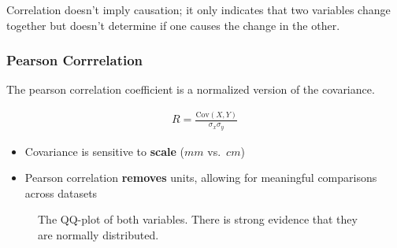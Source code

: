 \documentclass[
  a4paper,
]{scrbook}
\providecommand{\tightlist}{%
  \setlength{\itemsep}{0pt}\setlength{\parskip}{0pt}}\usepackage{longtable,booktabs,array}
\begin{document}
Correlation doesn't imply causation; it only indicates that two
variables change together but doesn't determine if one causes the change
in the other.

\subsubsection{Pearson Corrrelation}\label{pearson-corrrelation}

The pearson correlation coefficient is a normalized version of the
covariance.

\begin{align}
R = \frac{\mathrm{Cov}(X,Y)}{\sigma_x \sigma_y}
\end{align}

\begin{itemize}
\tightlist
\item
  Covariance is sensitive to \textbf{scale} (\(mm\) vs.~\(cm\))
\item
  Pearson correlation \textbf{removes} units, allowing for meaningful
  comparisons across datasets
\end{itemize}

\begin{figure}[ht]


\caption{\label{fig-drive-shaft-pearson-qq}The QQ-plot of both
variables. There is strong evidence that they are normally distributed.}

\end{figure}%
\end{document}
